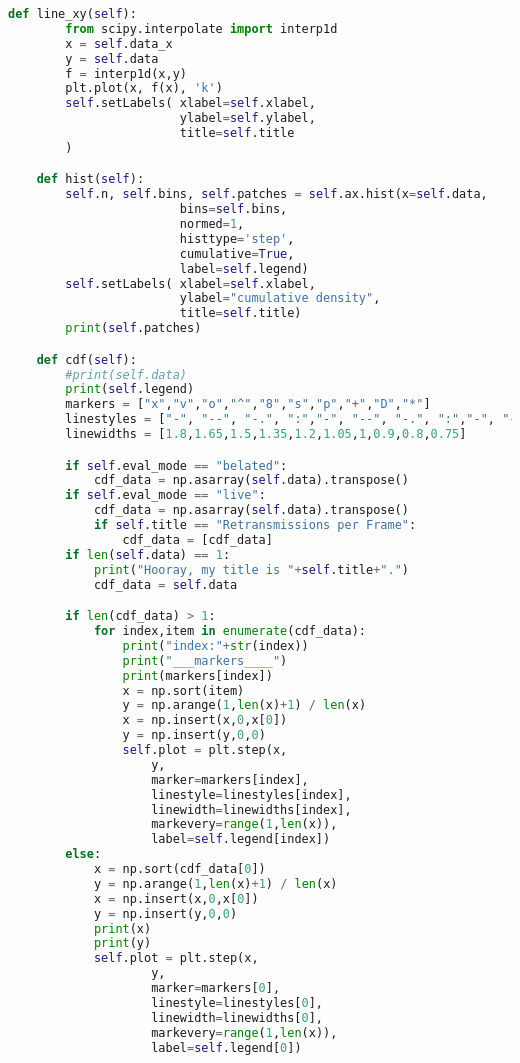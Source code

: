 \begin{lstlisting}[language=Python,caption=myplot.py]
    def line_xy(self):
        from scipy.interpolate import interp1d
        x = self.data_x
        y = self.data
        f = interp1d(x,y)
        plt.plot(x, f(x), 'k')
        self.setLabels( xlabel=self.xlabel,
                        ylabel=self.ylabel,
                        title=self.title
        )

    def hist(self):
        self.n, self.bins, self.patches = self.ax.hist(x=self.data,
                        bins=self.bins,
                        normed=1,
                        histtype='step',
                        cumulative=True,
                        label=self.legend)
        self.setLabels( xlabel=self.xlabel,
                        ylabel="cumulative density",
                        title=self.title)
        print(self.patches)

    def cdf(self):
        #print(self.data)
        print(self.legend)
        markers = ["x","v","o","^","8","s","p","+","D","*"]
        linestyles = ["-", "--", "-.", ":","-", "--", "-.", ":","-", "--"]
        linewidths = [1.8,1.65,1.5,1.35,1.2,1.05,1,0.9,0.8,0.75]

        if self.eval_mode == "belated":
            cdf_data = np.asarray(self.data).transpose()
        if self.eval_mode == "live":
            cdf_data = np.asarray(self.data).transpose()
            if self.title == "Retransmissions per Frame":
                cdf_data = [cdf_data]
        if len(self.data) == 1:
            print("Hooray, my title is "+self.title+".")
            cdf_data = self.data

        if len(cdf_data) > 1:
            for index,item in enumerate(cdf_data):
                print("index:"+str(index))
                print("___markers____")
                print(markers[index])
                x = np.sort(item)
                y = np.arange(1,len(x)+1) / len(x)
                x = np.insert(x,0,x[0])
                y = np.insert(y,0,0)
                self.plot = plt.step(x,
                    y,
                    marker=markers[index],
                    linestyle=linestyles[index],
                    linewidth=linewidths[index],
                    markevery=range(1,len(x)),
                    label=self.legend[index])
        else:
            x = np.sort(cdf_data[0])
            y = np.arange(1,len(x)+1) / len(x)
            x = np.insert(x,0,x[0])
            y = np.insert(y,0,0)
            print(x)
            print(y)
            self.plot = plt.step(x,
                    y,
                    marker=markers[0],
                    linestyle=linestyles[0],
                    linewidth=linewidths[0],
                    markevery=range(1,len(x)),
                    label=self.legend[0])


\end{lstlisting}
